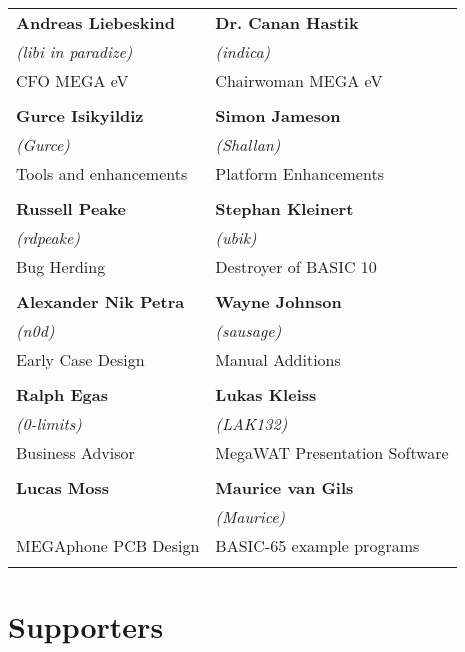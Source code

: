 \setlength{\tabcolsep}{1mm}
\begin{tabular}{p{6cm}p{6cm}}

{\large\bf Andreas Liebeskind}     & {\large\bf Dr. Canan Hastik} \\
 \textit{(libi in paradize)}       & \textit{(indica)} \\
CFO MEGA eV                        & Chairwoman MEGA eV \\
& \\
{\large\bf Gurce Isikyildiz}       & {\large\bf Simon Jameson} \\
 \textit{(Gurce)}                  &  \textit{(Shallan)} \\
Tools and enhancements             & Platform Enhancements \\
& \\
{\large\bf Russell Peake}          & {\large\bf Stephan Kleinert} \\
  \textit{(rdpeake)}               & \textit{(ubik)}        \\
Bug Herding                        & Destroyer of BASIC 10     \\
& \\
{\large\bf Alexander Nik Petra}    & {\large\bf Wayne Johnson} \\
 \textit{(n0d)}                    &  \textit{(sausage)} \\
Early Case Design                  & Manual Additions \\
& \\
{\large\bf Ralph Egas}             & {\large\bf Lukas Kleiss} \\
 \textit{(0-limits)}               & \textit{(LAK132)} \\
Business Advisor                   & MegaWAT Presentation Software \\
& \\
{\large\bf Lucas Moss}             & {\large\bf Maurice van Gils }  \\
                                   & \textit{(Maurice)}  \\
MEGAphone PCB Design               & BASIC-65 example programs \\
& \\
\end{tabular}

\newpage
\section{Supporters}

